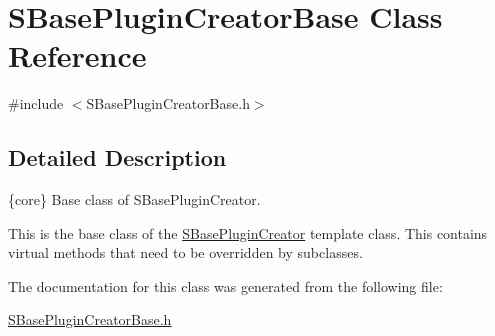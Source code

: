 \hypertarget{class_s_base_plugin_creator_base}{}\section{S\+Base\+Plugin\+Creator\+Base Class Reference}
\label{class_s_base_plugin_creator_base}


{\ttfamily \#include $<$S\+Base\+Plugin\+Creator\+Base.\+h$>$}



\subsection{Detailed Description}
\{core\} Base class of S\+Base\+Plugin\+Creator.



This is the base class of the \hyperlink{class_s_base_plugin_creator}{S\+Base\+Plugin\+Creator} template class. This contains virtual methods that need to be overridden by subclasses. 

The documentation for this class was generated from the following file\+:\begin{DoxyCompactItemize}
\item 
\hyperlink{_s_base_plugin_creator_base_8h}{S\+Base\+Plugin\+Creator\+Base.\+h}\end{DoxyCompactItemize}

